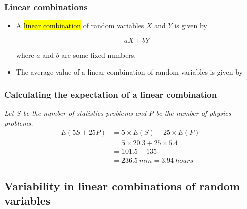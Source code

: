 \documentclass[slidestop,compress,mathserif]{beamer}
\newcommand{\soln}[1]{\textit{#1}}
\begin{document}

\begin{frame}
\frametitle{Linear combinations}

\begin{itemize}

\item A \hl{linear combination} of random variables $X$ and $Y$ is given by

\[ aX + bY \]

where $a$ and $b$ are some fixed numbers.

\pause

\item The average value of a linear combination of random variables is given by
\formula{\[ E(aX + bY) = a \times E(X) + b \times E(Y) \]}

\end{itemize}

\end{frame}


\begin{frame}
\frametitle{Calculating the expectation of a linear combination}


\soln{
\pause
Let $S$ be the number of statistics problems and $P$ be the number of physics problems. 
\begin{align*} 
E(5S+25P) &= 5 \times E(S) + 25 \times E(P) \\
&= 5 \times 20.3 + 25 \times 5.4 \\
&= 101.5 + 135 \\
&= 236.5~min = 3.94~hours
\end{align*}
}

\end{frame}


\subsection{Variability in linear combinations of random variables}

\end{document}
